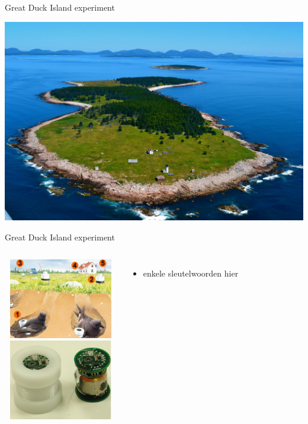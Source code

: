 \documentclass[presentation, bigger]{beamer}
\begin{document}
\begin{frame}[label=sec-1-3]{Great Duck Island experiment}

\includegraphics[width=\textwidth,keepaspectration=true]{gdi/gdi.jpg}

\end{frame}

\begin{frame}[label=sec-1-4]{Great Duck Island experiment}
\begin{columns}[t]
\centering
\includegraphics[width=5cm,height=3.5cm]{gdi/gdi_duckmote.jpg}\\
\includegraphics[width=5cm,height=3.5cm]{gdi/gdi_mote.png}
\centering
\begin{itemize}
\item enkele sleutelwoorden hier
\end{itemize}
\end{columns}
\end{frame}
\end{document}
